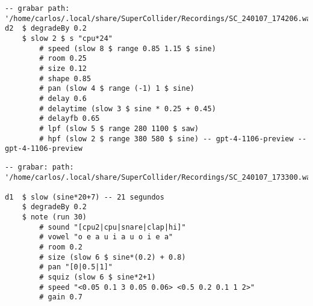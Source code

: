\begin{minipage}[t]{1\textwidth}
    \centering
    \begin{lstlisting}[style=SuperCollider-IDE, language=ExtendedHaskell, basicstyle=\footnotesize\ttfamily, numbers=none]
-- grabar path: '/home/carlos/.local/share/SuperCollider/Recordings/SC_240107_174206.wav'
d2  $ degradeBy 0.2 
    $ slow 2 $ s "cpu*24" 
        # speed (slow 8 $ range 0.85 1.15 $ sine) 
        # room 0.25 
        # size 0.12 
        # shape 0.85 
        # pan (slow 4 $ range (-1) 1 $ sine) 
        # delay 0.6 
        # delaytime (slow 3 $ sine * 0.25 + 0.45) 
        # delayfb 0.65 
        # lpf (slow 5 $ range 280 1100 $ saw) 
        # hpf (slow 2 $ range 380 580 $ sine) -- gpt-4-1106-preview -- gpt-4-1106-preview  
    \end{lstlisting}
    \vspace{1cm}
\end{minipage}






\begin{minipage}[t]{1\textwidth}
    \centering
    \begin{lstlisting}[style=SuperCollider-IDE, language=ExtendedHaskell, basicstyle=\footnotesize\ttfamily, numbers=none]
-- grabar: path: '/home/carlos/.local/share/SuperCollider/Recordings/SC_240107_173300.wav'

d1  $ slow (sine*20+7) -- 21 segundos
    $ degradeBy 0.2
    $ note (run 30) 
        # sound "[cpu2|cpu|snare|clap|hi]" 
        # vowel "o e a u i a u o i e a" 
        # room 0.2
        # size (slow 6 $ sine*(0.2) + 0.8) 
        # pan "[0|0.5|1]"
        # squiz (slow 6 $ sine*2+1) 
        # speed "<0.05 0.1 3 0.05 0.06> <0.5 0.2 0.1 1 2>" 
        # gain 0.7
    \end{lstlisting}
    \vspace{1cm}
\end{minipage}